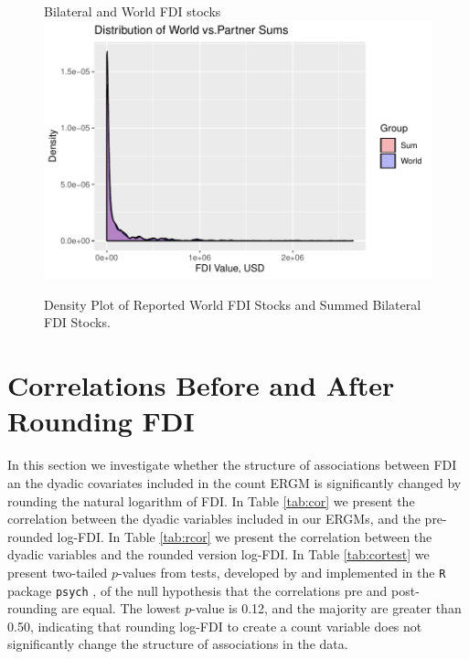 \documentclass[reqno,onecolumn,letterpaper,12pt]{article}
\newcommand{\R}{\texttt{R}} %
\begin{document}
\begin{figure}[!h]
\centering
Bilateral and World FDI stocks\\
\includegraphics[height=.4\textheight, clip=true, trim=0cm 0cm 0cm .6cm]{SI_figures/descriptive_plots/check_sums.pdf} \vspace{0cm}
\caption{\label{fig:flows} Density Plot of Reported World FDI Stocks and Summed Bilateral FDI Stocks.}
\end{figure}







\section{Correlations Before and After Rounding FDI} 

In this section we investigate whether the structure of associations between FDI an the dyadic covariates included in the count ERGM is significantly changed by rounding the natural logarithm of FDI. In Table \ref{tab:cor} we present the correlation between the dyadic variables included in our ERGMs, and the pre-rounded log-FDI. In Table \ref{tab:rcor} we present the correlation between the dyadic variables and the rounded version log-FDI. In Table \ref{tab:cortest} we present two-tailed $p$-values from tests, developed by \cite{dunn1969correlation} and implemented in the \R~ package \texttt{psych} \citep{psych}, of the null hypothesis that the correlations pre and post-rounding are equal. The lowest $p$-value is 0.12, and the majority are greater than 0.50, indicating that rounding log-FDI to create a count variable does not significantly change the structure of associations in the data. 
\end{document}
